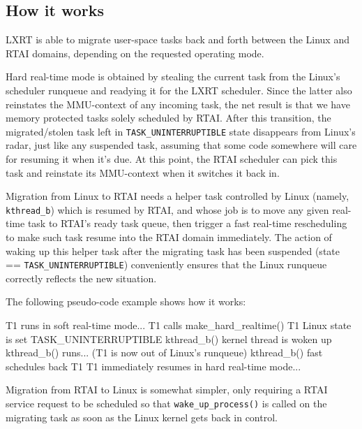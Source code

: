 
\subsection{How it works}

LXRT is able to migrate user-space tasks back and forth between the
Linux and RTAI domains, depending on the requested operating mode.

Hard real-time mode is obtained by stealing the current task from the
Linux's scheduler runqueue and readying it for the LXRT
scheduler. Since the latter also reinstates the MMU-context of any
incoming task, the net result is that we have memory protected tasks
solely scheduled by RTAI. After this transition, the migrated/stolen
task left in \texttt{TASK\_UNINTERRUPTIBLE} state disappears from Linux's radar,
just like any suspended task, assuming that some code somewhere will
care for resuming it when it's due. At this point, the RTAI scheduler
can pick this task and reinstate its MMU-context when it switches it
back in.

Migration from Linux to RTAI needs a helper task controlled by Linux
(namely, \texttt{kthread\_b}) which is resumed by RTAI, and whose job is to move
any given real-time task to RTAI's ready task queue, then trigger a
fast real-time rescheduling to make such task resume into the RTAI
domain immediately. The action of waking up this helper task after the
migrating task has been suspended (state == \texttt{TASK\_UNINTERRUPTIBLE})
conveniently ensures that the Linux runqueue correctly reflects the
new situation.

The following pseudo-code example shows how it works: 

\begin{code}
T1 runs in soft real-time mode...
        T1 calls make_hard_realtime()
                T1 Linux state is set TASK_UNINTERRUPTIBLE
                kthread_b() kernel thread is woken up
kthread_b() runs... (T1 is now out of Linux's runqueue)
        kthread_b() fast schedules back T1
T1 immediately resumes in hard real-time mode...
\end{code}

Migration from RTAI to Linux is somewhat simpler, only requiring a
RTAI service request to be scheduled so that \texttt{wake\_up\_process()} is
called on the migrating task as soon as the Linux kernel gets back in
control.


